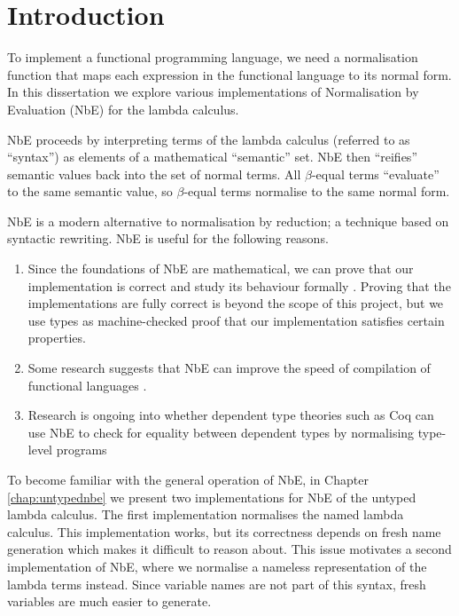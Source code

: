 \chapter{Introduction}
\label{chap:introduction}

To implement a functional programming language, we need a normalisation function that maps each expression in the functional language to its normal form.
In this dissertation we explore various implementations of Normalisation by Evaluation (NbE) for the lambda calculus.

NbE proceeds by interpreting terms of the lambda calculus (referred to as “syntax”) as elements of a mathematical “semantic” set. NbE then “reifies” semantic values back into the set of normal terms. All $\beta$-equal terms “evaluate” to the same semantic value, so $\beta$-equal terms normalise to the same normal form.

NbE is a modern alternative to normalisation by reduction; a technique based on syntactic rewriting. NbE is useful for the following reasons.

\begin{enumerate}
    \item Since the foundations of NbE are mathematical, we can prove that our implementation is correct and study its behaviour formally \cite{AgdaNbe}. Proving that the implementations are fully correct is beyond the scope of this project, but we use types as machine-checked proof that our implementation satisfies certain properties.
    \item Some research suggests that NbE can improve the speed of compilation of functional languages \cite{efficientNbE}.
    \item Research is ongoing into whether dependent type theories such as Coq can use NbE to check for equality between dependent types by normalising type-level programs \cite{deBruijn}
\end{enumerate}

To become familiar with the general operation of NbE, in Chapter \ref{chap:untypednbe} we present two implementations for NbE of the untyped lambda calculus. The first implementation normalises the named lambda calculus. This implementation works, but its correctness depends on fresh name generation which makes it difficult to reason about. This issue motivates a second implementation of NbE, where we normalise a nameless representation of the lambda terms instead. Since variable names are not part of this syntax, fresh variables are much easier to generate.

